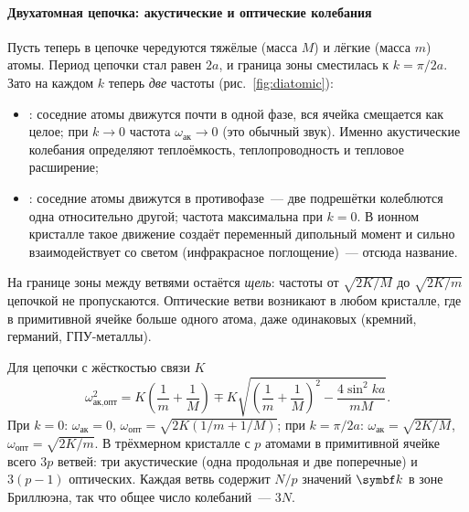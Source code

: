 \paragraph{Двухатомная цепочка: акустические и оптические колебания}
Пусть теперь в цепочке чередуются тяжёлые (масса $M$) и лёгкие (масса $m$)
атомы. Период цепочки стал равен $2a$, и граница зоны сместилась к
$k=\pi/2a$. Зато на каждом $k$ теперь \emph{две} частоты
(рис.~\ref{fig:diatomic}):
\begin{itemize}
\item {}: соседние атомы движутся почти в одной
фазе, вся ячейка смещается как целое; при $k\to0$ частота
$\omega_\text{ак}\to0$ (это обычный звук). Именно акустические колебания
определяют теплоёмкость, теплопроводность и тепловое расширение;
\item {}: соседние атомы движутся в
противофазе~— две подрешётки колеблются одна относительно другой;
частота максимальна при $k=0$. В ионном кристалле такое движение создаёт
переменный дипольный момент и сильно взаимодействует со светом
(инфракрасное поглощение)~— отсюда название.
\end{itemize}
На границе зоны между ветвями остаётся \emph{щель}: частоты от
$\sqrt{2K/M}$ до $\sqrt{2K/m}$ цепочкой не пропускаются. Оптические ветви
возникают в любом кристалле, где в примитивной ячейке больше одного атома,
даже одинаковых (кремний, германий, ГПУ-металлы).

\begin{podrobnee}
Для цепочки с жёсткостью связи $K$
\[
\omega^2_{\text{ак},\text{опт}}=K\left(\frac1m+\frac1M\right)\mp
K\sqrt{\left(\frac1m+\frac1M\right)^2-\frac{4\sin^2 ka}{mM}} .
\]
При $k=0$: $\omega_\text{ак}=0$, $\omega_\text{опт}=\sqrt{2K(1/m+1/M)}$; при
$k=\pi/2a$: $\omega_\text{ак}=\sqrt{2K/M}$, $\omega_\text{опт}=\sqrt{2K/m}$.
В трёхмерном кристалле с $p$ атомами в примитивной ячейке всего $3p$
ветвей: три акустические (одна продольная и две поперечные) и $3(p-1)$
оптических. Каждая ветвь содержит $N/p$ значений $\vb k$ в зоне
Бриллюэна, так что общее число колебаний~— $3N$.
\end{podrobnee}

